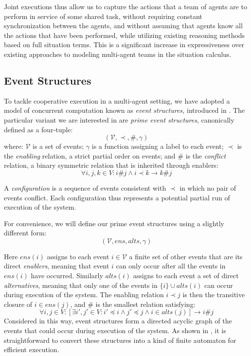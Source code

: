 Joint executions thus allow us to capture the actions that a team
of agents are to perform in service of some shared task, without requiring
constant synchronization between the agents, and without assuming
that agents know all the actions that have been performed, while utilizing
existing reasoning methods based on full situation terms. This is
a significant increase in expressiveness over existing approaches
to modeling multi-agent teams in the situation calculus.


\subsection{Event Structures}

To tackle cooperative execution in a multi-agent setting, we have
adopted a model of concurrent computation known as \emph{event structures,
}introduced in \citep{npw79event_structures}. The particular variant
we are interested in are \emph{prime event structures}, canonically
defined as a four-tuple:\[
(\mathcal{V},\prec,\#,\gamma)\]
 where: $\mathcal{V}$ is a set of events; $\gamma$ is a function
assigning a label to each event; $\prec$ is the \emph{enabling} relation,
a strict partial order on events; and $\#$ is the \emph{conflict}
relation, a binary symmetric relation that is inherited through enablers:\[
\forall i,j,k\in V:i\#j\wedge i\prec k\rightarrow k\#j\]


A \emph{configuration} is a sequence of events consistent with $\prec$
in which no pair of events conflict. Each configuration thus represents
a potential partial run of execution of the system.

For convenience, we will define our prime event structures using a
slightly different form:\[
(\mathcal{V},ens,alts,\gamma)\]


Here $ens(i)$ assigns to each event $i\in\mathcal{V}$ a finite set
of other events that are its direct \emph{enablers}, meaning that
event $i$ can only occur after all the events in $ens(i)$ have occurred.
Similarly $alts(i)$ assigns to each event a set of direct \emph{alternatives},
meaning that only one of the events in $\{i\}\cup alts(i)$ can occur
during execution of the system. The enabling relation $i\prec j$
is then the transitive closure of $i\in ens(j)$, and $\#$ is the
smallest relation satisfying:\[
\forall i,j\in V:[\exists i',j'\in V:i'\preceq i\wedge j'\preceq j\wedge i\in alts(j)]\rightarrow i\#j\]
 Considered in this way, event structures form a directed acyclic
graph of the events that could occur during execution of the system.
As shown in \citep{pratt91modeling_conc_with_geom}, it is straightforward
to convert these structures into a kind of finite automaton for efficient
execution.


